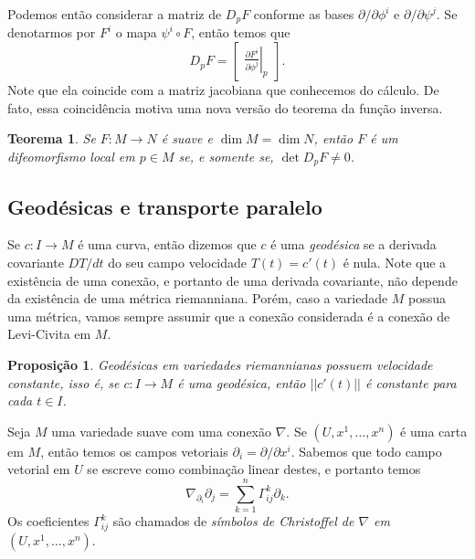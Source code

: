 \documentclass{article}
\newtheorem{proposition}[definition]{Proposição}
\newtheorem{theorem}[definition]{Teorema}
\begin{document}
Podemos então considerar a matriz de $D_pF$ conforme as bases $\partial/\partial \phi^i$ e $\partial/\partial \psi^j$. Se denotarmos por $F^i$ o mapa $\psi^i \circ F$, então temos que \begin{equation}
    D_pF = \begin{bmatrix}
        \left.\frac{\partial F^i}{\partial \phi^j}\right|_p
    \end{bmatrix}.
\end{equation} Note que ela coincide com a matriz jacobiana que conhecemos do cálculo. De fato, essa coincidência motiva uma nova versão do teorema da função inversa.

\begin{theorem}
    Se $F \colon M \to N$ é suave e $\dim M = \dim N$, então $F$ é um difeomorfismo local em $p \in M$ se, e somente se, $\det D_pF \neq 0$.
\end{theorem}

\subsection{Geodésicas e transporte paralelo}

Se $c \colon I \to M$ é uma curva, então dizemos que $c$ é uma \textit{geodésica} se a derivada covariante $DT/dt$ do seu campo velocidade $T(t) = c'(t)$ é nula. Note que a existência de uma conexão, e portanto de uma derivada covariante, não depende da existência de uma métrica riemanniana. Porém, caso a variedade $M$ possua uma métrica, vamos sempre assumir que a conexão considerada é a conexão de Levi-Civita em $M$.

\begin{proposition}
    Geodésicas em variedades riemannianas possuem velocidade constante, isso é, se $c \colon I \to M$ é uma geodésica, então $||c'(t)||$ é constante para cada $t \in I$.
\end{proposition}

Seja $M$ uma variedade suave com uma conexão $\nabla$. Se $(U, x^1, \dots, x^n)$ é uma carta em $M$, então temos os campos vetoriais $\partial_i = \partial/\partial x^i$. Sabemos que todo campo vetorial em $U$ se escreve como combinação linear destes, e portanto temos \begin{equation}
    \nabla_{\partial_i}\partial_j = \sum_{k = 1}^n \Gamma^k_{ij} \partial_k.
\end{equation}
Os coeficientes $\Gamma^k_{ij}$ são chamados de \textit{símbolos de Christoffel de $\nabla$ em $(U, x^1, \dots, x^n)$}.
\end{document}
